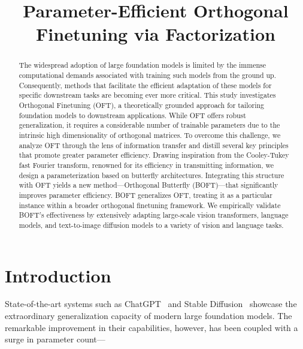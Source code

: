 \title{Parameter-Efficient Orthogonal Finetuning via Factorization}

\begin{abstract}
The widespread adoption of large foundation models is limited by the immense computational demands associated with training such models from the ground up. Consequently, methods that facilitate the efficient adaptation of these models for specific downstream tasks are becoming ever more critical. This study investigates Orthogonal Finetuning (OFT), a theoretically grounded approach for tailoring foundation models to downstream applications. While OFT offers robust generalization, it requires a considerable number of trainable parameters due to the intrinsic high dimensionality of orthogonal matrices. To overcome this challenge, we analyze OFT through the lens of information transfer and distill several key principles that promote greater parameter efficiency. Drawing inspiration from the Cooley-Tukey fast Fourier transform, renowned for its efficiency in transmitting information, we design a parameterization based on butterfly architectures. Integrating this structure with OFT yields a new method—Orthogonal Butterfly (BOFT)—that significantly improves parameter efficiency. BOFT generalizes OFT, treating it as a particular instance within a broader orthogonal finetuning framework. We empirically validate BOFT’s effectiveness by extensively adapting large-scale vision transformers, language models, and text-to-image diffusion models to a variety of vision and language tasks.
\end{abstract}

\section{Introduction}

State-of-the-art systems such as ChatGPT~\cite{brown2020language,chen2021evaluating} and Stable Diffusion~\cite{rombach2022high} showcase the extraordinary generalization capacity of modern large foundation models. The remarkable improvement in their capabilities, however, has been coupled with a surge in parameter count—

